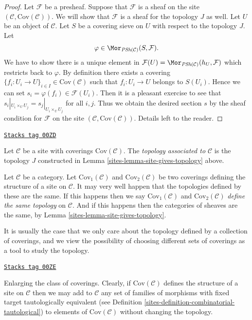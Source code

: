 \begin{proof}
\medskip\noindent
Let $\mathcal{F}$ be a presheaf. Suppose that $\mathcal{F}$
is a sheaf on the site $(\mathcal{C}, \text{Cov}(\mathcal{C}))$.
We will show that $\mathcal{F}$ is a sheaf for the topology $J$
as well. Let $U$ be an object of $\mathcal{C}$. Let
$S$ be a covering sieve on $U$ with respect to the topology $J$.
Let
$$
\varphi \in \Mor_{\textit{PSh}(\mathcal{C})}(S, \mathcal{F}).
$$
We have to show there is a unique element in
$\mathcal{F}(U) = \Mor_{\textit{PSh}(\mathcal{C})}(h_U, \mathcal{F})$
which restricts back to $\varphi$. By definition there exists
a covering $\{f_i : U_i \to U\}_{i\in I} \in \text{Cov}(\mathcal{C})$
such that $f_i : U_i \to U$ belongs to $S(U_i)$.  Hence
we can set $s_i = \varphi(f_i) \in \mathcal{F}(U_i)$.
Then it is a pleasant exercise to see that
$s_i|_{U_i \times_U U_j} = s_j|_{U_i \times_U U_j}$ for all
$i, j$. Thus we obtain the desired section $s$ by the sheaf
condition for $\mathcal{F}$ on the site
$(\mathcal{C}, \text{Cov}(\mathcal{C}))$.
Details left to the reader.
\end{proof}

\begin{definition}
\label{sites-definition-topology-associated-site}
\href{https://stacks.math.columbia.edu/tag/00ZD}{\texttt{Stacks tag 00ZD}}

Let $\mathcal{C}$ be a site with coverings $\text{Cov}(\mathcal{C})$.
The {\it topology associated to $\mathcal{C}$} is the topology
$J$ constructed in Lemma \ref{sites-lemma-site-gives-topology} above.
\end{definition}

Let $\mathcal{C}$ be a category.
Let $\text{Cov}_1(\mathcal{C})$ and $\text{Cov}_2(\mathcal{C})$
be two coverings defining the structure of a site on $\mathcal{C}$.
It may very well happen that the topologies defined
by these are the same. If this happens
then we say $\text{Cov}_1(\mathcal{C})$ and
$\text{Cov}_2(\mathcal{C})$ {\it define the same topology} on
$\mathcal{C}$. And if this happens then the categories of sheaves
are the same, by Lemma \ref{sites-lemma-site-gives-topology}.

\medskip\noindent
It is usually the case that we only care about the topology defined
by a collection of coverings, and we view the possibility of choosing
different sets of coverings as a tool to study the topology.

\begin{remark}
\label{sites-remark-enlarge-coverings}
\href{https://stacks.math.columbia.edu/tag/00ZE}{\texttt{Stacks tag 00ZE}}

Enlarging the class of coverings.
Clearly, if $\text{Cov}(\mathcal{C})$
defines the structure of a site on $\mathcal{C}$ then we may
add to $\mathcal{C}$ any set of families of morphisms with fixed target
tautologically equivalent
(see Definition \ref{sites-definition-combinatorial-tautological})
to elements of $\text{Cov}(\mathcal{C})$ without changing the topology.
\end{remark}

